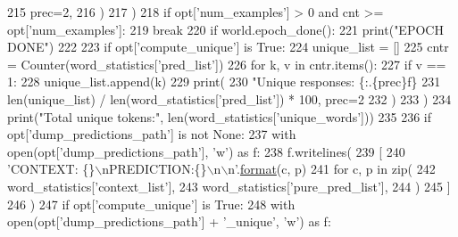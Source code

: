 \begin{DoxyCode}
{215                     prec=2,
216                 )
217             )
218         \textcolor{keywordflow}{if} opt[\textcolor{stringliteral}{'num\_examples'}] > 0 \textcolor{keywordflow}{and} cnt >= opt[\textcolor{stringliteral}{'num\_examples'}]:
219             \textcolor{keywordflow}{break}
220     \textcolor{keywordflow}{if} world.epoch\_done():
221         print(\textcolor{stringliteral}{"EPOCH DONE"})
222 
223     \textcolor{keywordflow}{if} opt[\textcolor{stringliteral}{'compute\_unique'}] \textcolor{keywordflow}{is} \textcolor{keyword}{True}:
224         unique\_list = []
225         cntr = Counter(word\_statistics[\textcolor{stringliteral}{'pred\_list'}])
226         \textcolor{keywordflow}{for} k, v \textcolor{keywordflow}{in} cntr.items():
227             \textcolor{keywordflow}{if} v == 1:
228                 unique\_list.append(k)
229         print(
230             \textcolor{stringliteral}{"Unique responses: \{:.\{prec\}f\}%
231                 len(unique\_list) / len(word\_statistics[\textcolor{stringliteral}{'pred\_list'}]) * 100, prec=2
232             )
233         )
234     print(\textcolor{stringliteral}{"Total unique tokens:"}, len(word\_statistics[\textcolor{stringliteral}{'unique\_words'}]))
235 
236     \textcolor{keywordflow}{if} opt[\textcolor{stringliteral}{'dump\_predictions\_path'}] \textcolor{keywordflow}{is} \textcolor{keywordflow}{not} \textcolor{keywordtype}{None}:
237         with open(opt[\textcolor{stringliteral}{'dump\_predictions\_path'}], \textcolor{stringliteral}{'w'}) \textcolor{keyword}{as} f:
238             f.writelines(
239                 [
240                     \textcolor{stringliteral}{'CONTEXT: \{\}\(\backslash\)nPREDICTION:\{\}\(\backslash\)n\(\backslash\)n'}.\hyperlink{namespaceparlai_1_1chat__service_1_1services_1_1messenger_1_1shared__utils_a32e2e2022b824fbaf80c747160b52a76}{format}(c, p)
241                     \textcolor{keywordflow}{for} c, p \textcolor{keywordflow}{in} zip(
242                         word\_statistics[\textcolor{stringliteral}{'context\_list'}],
243                         word\_statistics[\textcolor{stringliteral}{'pure\_pred\_list'}],
244                     )
245                 ]
246             )
247         \textcolor{keywordflow}{if} opt[\textcolor{stringliteral}{'compute\_unique'}] \textcolor{keywordflow}{is} \textcolor{keyword}{True}:
248             with open(opt[\textcolor{stringliteral}{'dump\_predictions\_path'}] + \textcolor{stringliteral}{'\_unique'}, \textcolor{stringliteral}{'w'}) \textcolor{keyword}{as} f:
}}
\end{DoxyCode}
